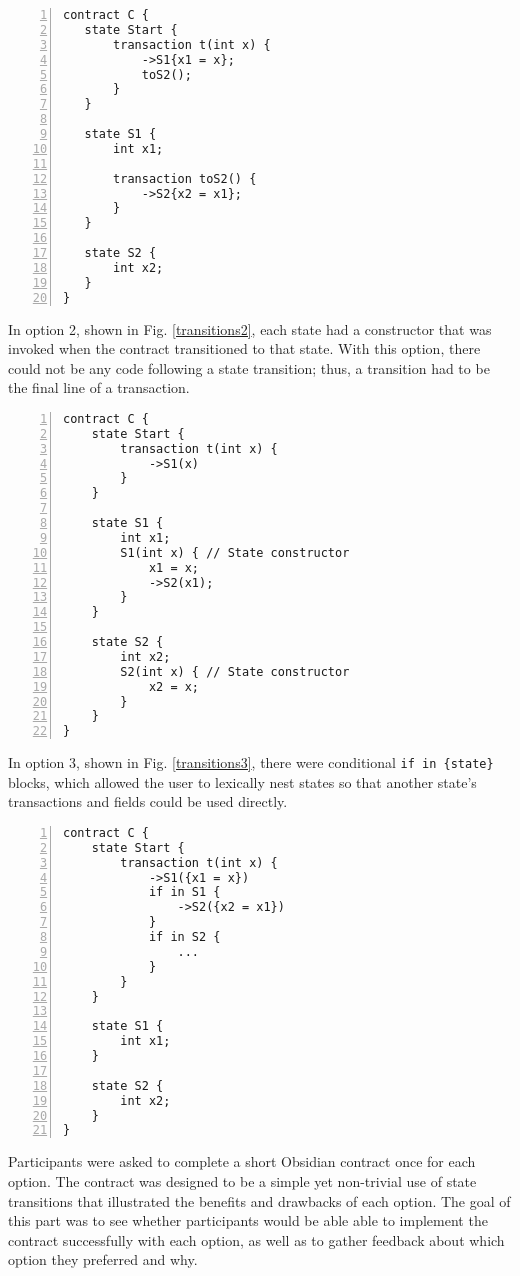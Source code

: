 \documentclass[sigplan,10pt,review]{acmart}\settopmatter{printfolios=true}
\begin{document}
\begin{lstlisting}[caption={Option 1 for state transitions},captionpos=b, label=transitions1, numbers=left, xleftmargin=.5cm]
contract C {
   state Start {
       transaction t(int x) {
           ->S1{x1 = x};
           toS2();
       }
   }

   state S1 {
       int x1;

       transaction toS2() {
           ->S2{x2 = x1};
       }
   }

   state S2 {
       int x2;
   }
}
\end{lstlisting}

In option 2, shown in Fig. \ref{transitions2}, each state had a constructor that was invoked when the contract transitioned to that state. 
With this option, there could not be any code following a state transition; thus, a transition had to be the final line of a 
transaction. 

\begin{lstlisting}[caption = {Option 2 for state transitions}, captionpos = b, label = transitions2, numbers = left,
xleftmargin = .5cm]
contract C {
    state Start {
        transaction t(int x) {
            ->S1(x)
        }
    }

    state S1 {
        int x1;
        S1(int x) { // State constructor
            x1 = x;
            ->S2(x1);
        }
    }

    state S2 {
        int x2;
        S2(int x) { // State constructor 
            x2 = x;
        }
    }
}
\end{lstlisting}

In option 3, shown in Fig. \ref{transitions3}, there were conditional \texttt{\small{if in \{state\}}} blocks, which allowed the user
to lexically nest states so that another state's transactions and fields could be used directly. 

\begin{lstlisting}[caption = {Option 3 for state transitions}, captionpos = b, label = transitions3, numbers = left,
xleftmargin = .5cm]
contract C {
    state Start {
        transaction t(int x) {
            ->S1({x1 = x})
            if in S1 {
                ->S2({x2 = x1})
            }
            if in S2 {
            	...
            }
        }
    }

    state S1 {
        int x1;
    }

    state S2 {
        int x2;
    }
}
\end{lstlisting}

Participants were asked to complete a short Obsidian contract once for each option. The contract was 
designed to be a simple yet non-trivial use of state transitions that illustrated the benefits and drawbacks of each 
option. The goal of this part was to see whether participants would be able able to implement the 
contract successfully with each option, as well as to gather feedback about which option they preferred and why.
\end{document}
